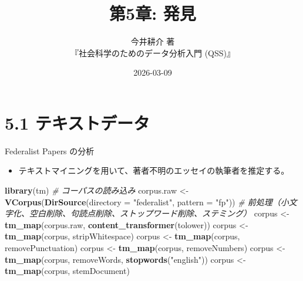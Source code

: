 \documentclass[
  ignorenonframetext,
]{beamer}
\title{第5章: 発見}
\subtitle{今井耕介 著\\
『社会科学のためのデータ分析入門 (QSS)』}
\author{}
\date{\vspace{-2.5em}2026-03-09}
\newenvironment{Shaded}{\begin{snugshade}}{\end{snugshade}}
\newcommand{\AttributeTok}[1]{\textcolor[rgb]{0.13,0.29,0.53}{#1}}
\newcommand{\CommentTok}[1]{\textcolor[rgb]{0.56,0.35,0.01}{\textit{#1}}}
\newcommand{\FunctionTok}[1]{\textcolor[rgb]{0.13,0.29,0.53}{\textbf{#1}}}
\newcommand{\NormalTok}[1]{#1}
\newcommand{\OtherTok}[1]{\textcolor[rgb]{0.56,0.35,0.01}{#1}}
\newcommand{\StringTok}[1]{\textcolor[rgb]{0.31,0.60,0.02}{#1}}
\providecommand{\tightlist}{%
  \setlength{\itemsep}{0pt}\setlength{\parskip}{0pt}}
\begin{document}
\frame{\titlepage}

\section{5.1
テキストデータ}\label{ux30c6ux30adux30b9ux30c8ux30c7ux30fcux30bf}

\begin{frame}[fragile]{Federalist Papers の分析}
\label{federalist-papers-ux306eux5206ux6790}
\begin{itemize}
\tightlist
\item
  テキストマイニングを用いて、著者不明のエッセイの執筆者を推定する。
\end{itemize}

\scriptsize

\begin{Shaded}
\begin{Highlighting}[]
\FunctionTok{library}\NormalTok{(tm)}
\CommentTok{\# コーパスの読み込み}
\NormalTok{corpus.raw }\OtherTok{\textless{}{-}} \FunctionTok{VCorpus}\NormalTok{(}\FunctionTok{DirSource}\NormalTok{(}\AttributeTok{directory =} \StringTok{"federalist"}\NormalTok{, }\AttributeTok{pattern =} \StringTok{"fp"}\NormalTok{))}
\CommentTok{\# 前処理（小文字化、空白削除、句読点削除、ストップワード削除、ステミング）}
\NormalTok{corpus }\OtherTok{\textless{}{-}} \FunctionTok{tm\_map}\NormalTok{(corpus.raw, }\FunctionTok{content\_transformer}\NormalTok{(tolower))}
\NormalTok{corpus }\OtherTok{\textless{}{-}} \FunctionTok{tm\_map}\NormalTok{(corpus, stripWhitespace)}
\NormalTok{corpus }\OtherTok{\textless{}{-}} \FunctionTok{tm\_map}\NormalTok{(corpus, removePunctuation)}
\NormalTok{corpus }\OtherTok{\textless{}{-}} \FunctionTok{tm\_map}\NormalTok{(corpus, removeNumbers)}
\NormalTok{corpus }\OtherTok{\textless{}{-}} \FunctionTok{tm\_map}\NormalTok{(corpus, removeWords, }\FunctionTok{stopwords}\NormalTok{(}\StringTok{"english"}\NormalTok{))}
\NormalTok{corpus }\OtherTok{\textless{}{-}} \FunctionTok{tm\_map}\NormalTok{(corpus, stemDocument)}
\end{Highlighting}
\end{Shaded}

\normalsize
\end{frame}
\end{document}
